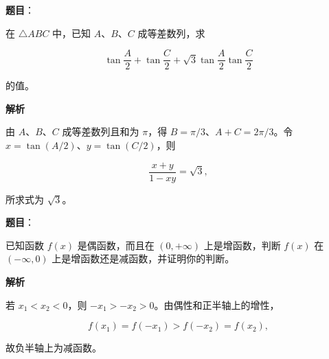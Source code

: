 \begin{answer}

\textbf{题目}：

在 $\triangle ABC$ 中，已知 $A\text{、}B\text{、}C$ 成等差数列，求

\nopagebreak[4]
\[
\tan\frac A2+\tan\frac C2+\sqrt3\tan\frac A2\tan\frac C2
\]

的值。

\textbf{解析}

由 $A\text{、}B\text{、}C$ 成等差数列且和为 $\pi$，得 $B=\pi/3$、$A+C=2\pi/3$。令 $x=\tan(A/2)$、$y=\tan(C/2)$，则

\nopagebreak[4]
\[
\frac{x+y}{1-xy}=\sqrt3,
\]

所求式为 $\sqrt3$。


\end{answer}
\begin{answer}

\textbf{题目}：

已知函数 $f(x)$ 是偶函数，而且在 $(0,+\infty)$ 上是增函数，判断 $f(x)$ 在 $(-\infty,0)$ 上是增函数还是减函数，并证明你的判断。

\textbf{解析}

若 $x_1<x_2<0$，则 $-x_1>-x_2>0$。由偶性和正半轴上的增性，

\nopagebreak[4]
\[
f(x_1)=f(-x_1)>f(-x_2)=f(x_2),
\]

故负半轴上为减函数。


\end{answer}
